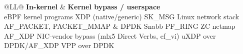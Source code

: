 \documentclass[11pt,a4paper]{article}
\begin{document}
\begin{table}[!t]
\centering
\small
\begin{tabularx}{\textwidth}{@{}LL@{}}
\toprule
\textbf{In-kernel} & \textbf{Kernel bypass / userspace} \\
\midrule
eBPF kernel programs \cite{xdp2018,freitas2022,tu2021}\newline
\hspace*{1em}XDP (native/generic) \cite{xdp2018,tu2021}\newline
\hspace*{1em}SK\_MSG \cite{middlenet2023}\newline
Linux network stack \cite{xdp2018,tu2021,ara2020}\newline
\hspace*{1em}AF\_PACKET, PACKET\_MMAP \cite{valia2026,packetio2026,abtrda3}
&
DPDK \cite{gallenmueller2015,metronome2023,valia2026,tu2021,ara2020,packetio2026,abtrda3}\newline
Snabb \cite{ara2020}\newline
PF\_RING ZC \cite{gallenmueller2015}\newline
netmap \cite{gallenmueller2015}\newline
AF\_XDP \cite{mole2025,edge2023,valia2026,tu2021,packetio2026,abtrda3}\newline
NIC-vendor bypass (mlx5 Direct Verbs, ef\_vi) \cite{packetio2026,abtrda3}\newline
uXDP over DPDK/AF\_XDP \cite{uxdp2025}\newline
VPP over DPDK \cite{ara2020} \\
\bottomrule
\end{tabularx}
\end{table}
\end{document}
